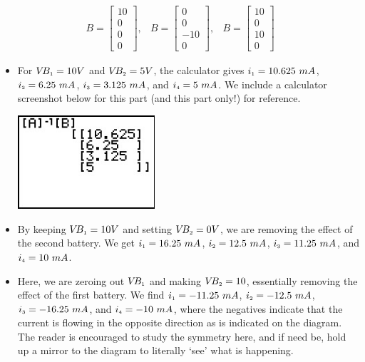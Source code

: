 \documentclass{ximera}
\begin{document}
\begin{ex}
\[\begin{array}{cccc}
 B = \left[ \begin{array}{r} 10 \\ 0 \\ 0 \\ 0 \end{array} \right], & 

B = \left[ \begin{array}{r} 0 \\ 0 \\ -10 \\ 0 \end{array} \right], & 

 B = \left[ \begin{array}{r} 10 \\ 0 \\ 10 \\ 0 \end{array} \right] 

\end{array} \]

\begin{itemize}

\item  For $V\!B_{\mbox{\tiny$1$}} = 10 V$ and $V\!B_{\mbox{\tiny$2$}} = 5 V$, the calculator gives $i_{\mbox{\tiny$1$}} = 10.625 \, \, mA$, $i_{\mbox{\tiny$2$}} = 6.25 \, \, mA$, $i_{\mbox{\tiny$3$}} = 3.125 \, \, mA$, and $i_{\mbox{\tiny$4$}} = 5 \, \, mA$.  We include a calculator screenshot below for this part (and this part only!) for reference.


\centerline{\includegraphics[width=2in]{./MatMethodsGraphics/MATRIXINVERSE03.jpg}}


\item  By keeping  $V\!B_{\mbox{\tiny$1$}} = 10 V$ and setting $V\!B_{\mbox{\tiny$2$}} = 0 V$, we are removing the effect of the second battery. We get $i_{\mbox{\tiny$1$}} = 16.25 \, \, mA$, $i_{\mbox{\tiny$2$}} = 12.5 \, \, mA$, $i_{\mbox{\tiny$3$}} = 11.25 \, \, mA$, and $i_{\mbox{\tiny$4$}} = 10 \, \, mA$.  


\item  Here, we  are zeroing out $V\!B_{\mbox{\tiny$1$}}$ and making $V\!B_{\mbox{\tiny$2$}} = 10$, essentially removing the effect of the first battery.  We find $i_{\mbox{\tiny$1$}} = -11.25 \, \, mA$, $i_{\mbox{\tiny$2$}} = -12.5 \, \, mA$, $i_{\mbox{\tiny$3$}} = -16.25 \, \, mA$, and $i_{\mbox{\tiny$4$}} = -10 \, \, mA$, where the negatives indicate that the current is flowing in the opposite direction as is indicated on the diagram. The reader is encouraged to study the symmetry here, and if need be, hold up a mirror to the diagram to literally `see' what is happening.


\end{itemize}
\end{ex}
\end{document}
